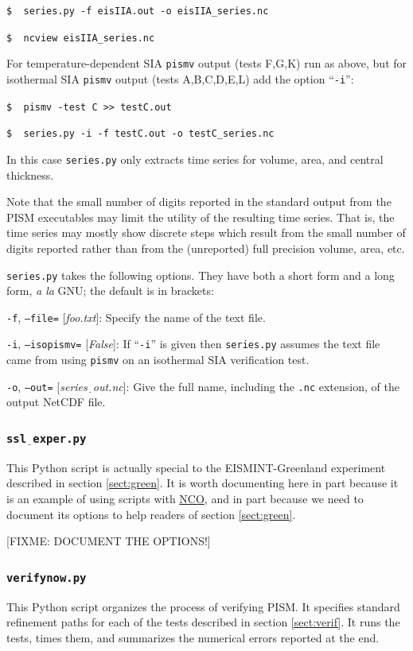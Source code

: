 \documentclass[11pt,final]{amsart}
\newcommand{\optoptdef}[3]{\vspace{1mm}\noindent \large\texttt{-#1},\,\,\texttt{--#2=}\normalsize\,\,[\textsl{#3}]:\quad}
\newcommand{\und}{$\underline{\,\,\,}$}
\begin{document}
\verb|$  series.py -f eisIIA.out -o eisIIA_series.nc|

\verb|$  ncview eisIIA_series.nc|

For temperature-dependent SIA \verb|pismv| output (tests F,G,K) run as above, but for isothermal SIA \verb|pismv| output (tests A,B,C,D,E,L) add the option ``\verb|-i|'':

\verb|$  pismv -test C >> testC.out|

\verb|$  series.py -i -f testC.out -o testC_series.nc|

\noindent In this case \verb|series.py| only extracts time series for volume, area, and central thickness.

Note that the small number of digits reported in the standard output from the PISM executables may limit the utility of the resulting time series.  That is, the time series may mostly show discrete steps which result from the small number of digits reported rather than from the (unreported) full precision volume, area, etc.

\verb|series.py| takes the following options.  They have both a short form and a long form, \emph{a la} GNU; the default is in brackets:

\optoptdef{f}{file}{foo.txt} Specify the name of the text file.

\optoptdef{i}{isopismv}{False} If ``\verb|-i|'' is given then \verb|series.py| assumes the text file came from using \verb|pismv| on an isothermal SIA verification test.

\optoptdef{o}{out}{series\und out.nc} Give the full name, including the \verb|.nc| extension, of the output NetCDF file.



\subsubsection*{\Large{\texttt{ssl\und exper.py}}}  This Python script is actually special to the EISMINT-Greenland experiment described in section \ref{sect:green}.  It is worth documenting here in part because it is an example of using scripts with \href{http://nco.sourceforge.net/}{NCO}, and in part because we need to document its options to help readers of section \ref{sect:green}.

[FIXME: DOCUMENT THE OPTIONS!]


\subsubsection*{\Large{\texttt{verifynow.py}}}  This Python script organizes the process of verifying PISM.  It specifies standard refinement paths for each of the tests described in section \ref{sect:verif}.  It runs the tests, times them, and summarizes the numerical errors reported at the end.
\end{document}

